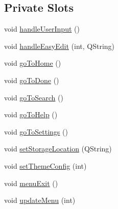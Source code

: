 \subsection*{Private Slots}
\begin{DoxyCompactItemize}
\item 
void \hyperlink{class_do_lah_1_1_do_lah_u_i_aa50dca189854b90bea93f41107780e38}{handle\+User\+Input} ()
\item 
void \hyperlink{class_do_lah_1_1_do_lah_u_i_a703340084af4f1ec2b5f67f11de943c2}{handle\+Easy\+Edit} (int, Q\+String)
\item 
void \hyperlink{class_do_lah_1_1_do_lah_u_i_a2e0e601cd7da1d227e1a70f25a5d8afd}{go\+To\+Home} ()
\item 
void \hyperlink{class_do_lah_1_1_do_lah_u_i_a08f98deef7f34063e0c03b81743aabd5}{go\+To\+Done} ()
\item 
void \hyperlink{class_do_lah_1_1_do_lah_u_i_abb9c0a8d54c90eb892e250a0e913ff64}{go\+To\+Search} ()
\item 
void \hyperlink{class_do_lah_1_1_do_lah_u_i_a4779ada88c0a25afe84b52bf5efa9db5}{go\+To\+Help} ()
\item 
void \hyperlink{class_do_lah_1_1_do_lah_u_i_ad47a9ebcd02c1787e6c84de2cd87c232}{go\+To\+Settings} ()
\item 
void \hyperlink{class_do_lah_1_1_do_lah_u_i_abab3d8211a702d99233065ceff49869a}{set\+Storage\+Location} (Q\+String)
\item 
void \hyperlink{class_do_lah_1_1_do_lah_u_i_aeeb3c0507a952006f8a4c9904240a740}{set\+Theme\+Config} (int)
\item 
void \hyperlink{class_do_lah_1_1_do_lah_u_i_aa7c3cb6c37bb68774c299ddcec1ab406}{menu\+Exit} ()
\item 
void \hyperlink{class_do_lah_1_1_do_lah_u_i_a09f06a356bb50752bb12b555bb09c0f7}{update\+Menu} (int)
\end{DoxyCompactItemize}
